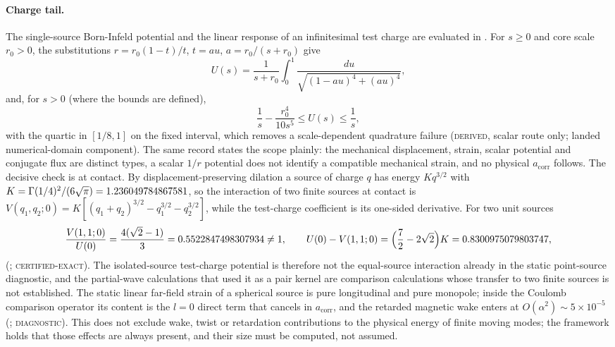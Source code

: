 \documentclass[aps,prd,onecolumn,amsmath,amssymb,longbibliography,floatfix,nofootinbib]{revtex4-2}
\newcommand{\acorr}{a_{\mathrm{corr}}}
\newcommand{\st}[1]{\textsc{#1}}
\begin{document}
\paragraph{Charge tail.} The single-source Born-Infeld potential and the linear response of an infinitesimal test charge are evaluated in . For $s\ge0$ and core scale $r_0>0$, the substitutions $r=r_0(1-t)/t$, $t=au$, $a=r_0/(s+r_0)$ give
\begin{equation}
U(s)=\frac{1}{s+r_0}\int_0^1\frac{du}{\sqrt{(1-au)^4+(au)^4}},
\end{equation}
and, for $s>0$ (where the bounds are defined),
\begin{equation}
\frac1s-\frac{r_0^4}{10s^5}\le U(s)\le\frac1s ,
\end{equation}
with the quartic in $[1/8,1]$ on the fixed interval, which removes a scale-dependent quadrature failure (\st{derived}, scalar route only; landed numerical-domain component). The same record states the scope plainly: the mechanical displacement, strain, scalar potential and conjugate flux are distinct types, a scalar $1/r$ potential does not identify a compatible mechanical strain, and no physical $\acorr$ follows. The decisive check is at contact. By displacement-preserving dilation a source of charge $q$ has energy $Kq^{3/2}$ with $K=\Gamma(1/4)^2/(6\sqrt\pi)=1.236049784867581$, so the interaction of two finite sources at contact is $V(q_1,q_2;0)=K[(q_1+q_2)^{3/2}-q_1^{3/2}-q_2^{3/2}]$, while the test-charge coefficient is its one-sided derivative. For two unit sources
\begin{equation}
\frac{V(1,1;0)}{U(0)}=\frac{4(\sqrt2-1)}{3}=0.5522847498307934\neq1,\qquad U(0)-V(1,1;0)=\Bigl(\frac72-2\sqrt2\Bigr)K=0.8300975079803747 ,
\end{equation}
(; \st{certified-exact}). The isolated-source test-charge potential is therefore not the equal-source interaction already in the static point-source diagnostic, and the partial-wave calculations that used it as a pair kernel are comparison calculations whose transfer to two finite sources is not established. The static linear far-field strain of a spherical source is pure longitudinal and pure monopole; inside the Coulomb comparison operator its content is the $l=0$ direct term that cancels in $\acorr$, and the retarded magnetic wake enters at $O(\alpha^2)\sim5\times10^{-5}$ (; \st{diagnostic}). This does not exclude wake, twist or retardation contributions to the physical energy of finite moving modes; the framework holds that those effects are always present, and their size must be computed, not assumed.
\end{document}
